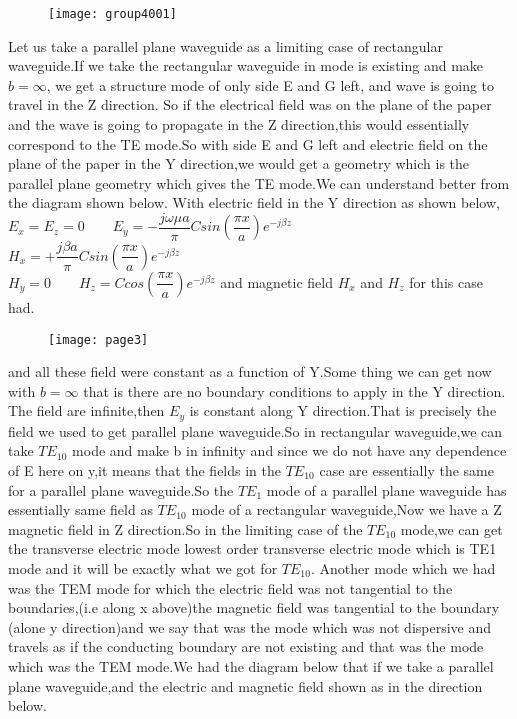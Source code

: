 		\begin{figure}[h]
		\centering
		\vspace{-20pt}
		\texttt{[image: group4001]}
		\caption{}
	\end{figure}
	Let us take a parallel plane waveguide as a limiting case of rectangular waveguide.If we take the rectangular waveguide in mode is existing and make ${b=\infty}$, we get a structure mode of only side E and G left, and wave is going to travel in the Z direction. So if the electrical field was on the plane of the paper and the wave is going to propagate in the Z direction,this would essentially correspond to the TE mode.So with side E and G left and electric field on the plane of the paper in the Y direction,we would get a geometry which is the parallel plane geometry which gives the TE mode.We can understand better from the diagram shown below.
	With electric field in the Y direction as shown below,\\
	${E_x = E_z = 0 \qquad E_y = - \dfrac{j\omega\mu a}{\pi} Csin(\dfrac{\pi x}{a})e^{-j\beta z}}$\\
	$H_x = + \dfrac{j\beta a}{\pi} Csin(\dfrac{\pi x}{a})e^{-j\beta z}$\\
	$H_y = 0\qquad H_z = Ccos(\dfrac{\pi x}{a})e^{-j\beta z}$ and magnetic field ${H_x}$ and ${H_z}$ for this case had.
	\begin{figure}[h]
	\centering
	\vspace{-10pt}
	\texttt{[image: page3]}
	\caption{}
\end{figure}
	and all these field were constant as a function of Y.Some thing we can get now with ${b=\infty}$ that is there are no boundary conditions to apply in the Y direction. The field are infinite,then ${E_y}$ is constant along Y direction.That is precisely the field we used to get parallel plane waveguide.So in rectangular waveguide,we can take ${TE_{10}}$ mode and make b in infinity and since we do not have any dependence of E here on y,it means that the fields in the ${TE_{10}}$ case are essentially the same for a parallel plane waveguide.So the ${TE_1}$ mode of a parallel plane waveguide has essentially same field as ${TE_{10}}$ mode of a rectangular waveguide,Now we have a Z magnetic field in Z direction.So in the limiting case of the ${TE_{10}}$ mode,we can get the transverse electric mode lowest order transverse electric mode which is TE1 mode and it will be exactly what we got for ${TE_{10}}$. Another mode which we had was the TEM mode for which the electric field was not tangential to the boundaries,(i.e along x above)the magnetic field was tangential to the boundary (alone y direction)and we say that was the mode which was not dispersive and travels as if the conducting boundary are not existing and that was the mode which was the TEM mode.We had the diagram below that if we take a parallel plane waveguide,and the electric and magnetic field shown as in the direction below. 
